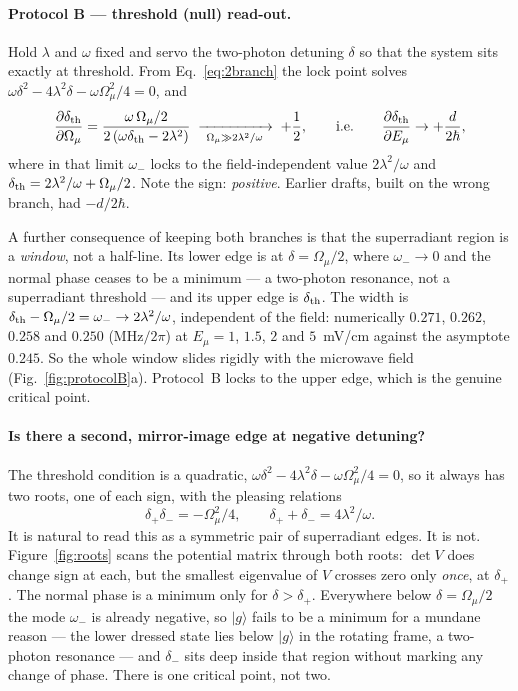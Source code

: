 \documentclass[11pt,a4paper]{article}
\newcommand{\Omu}{\Omega_{\mu}}
\newcommand{\ket}[1]{\lvert #1 \rangle}
\begin{document}
\paragraph{Protocol B --- threshold (null) read-out.}
Hold $\lambda$ and $\omega$ fixed and servo the two-photon detuning $\delta$ so that the
system sits exactly at threshold. From Eq.~\eqref{eq:2branch} the lock point solves
$\omega\delta^2-4\lambda^2\delta-\omega\Omu^2/4=0$, and
\begin{equation}
  \frac{\partial\delta_{\rm th}}{\partial\Omu}
   = \frac{\omega\,\Omu/2}{2\left(\omega\delta_{\rm th}-2\lambda^2\right)}
  \;\xrightarrow[\ \Omu\gg2\lambda^2/\omega\ ]{}\;+\frac12,
  \qquad\text{i.e.}\qquad
  \frac{\partial \delta_{\rm th}}{\partial E_\mu} \to +\frac{d}{2\hbar},
  \label{eq:slopeB}
\end{equation}
where in that limit $\omega_-$ locks to the field-independent value $2\lambda^2/\omega$ and
$\delta_{\rm th}=2\lambda^2/\omega+\Omu/2$. Note the sign: \emph{positive}. Earlier drafts,
built on the wrong branch, had $-d/2\hbar$.

A further consequence of keeping both branches is that the superradiant region is a
\emph{window}, not a half-line. Its lower edge is at $\delta=\Omu/2$, where $\omega_-\to0$ and
the normal phase ceases to be a minimum --- a two-photon resonance, not a superradiant
threshold --- and its upper edge is $\delta_{\rm th}$. The width is
$\delta_{\rm th}-\Omu/2=\omega_-\to2\lambda^2/\omega$, independent of the field: numerically
$0.271$, $0.262$, $0.258$ and $0.250$ (MHz$/2\pi$) at $E_\mu=1$, $1.5$, $2$ and $5$~mV/cm
against the asymptote $0.245$. So the whole window slides rigidly with the microwave field
(Fig.~\ref{fig:protocolB}a). Protocol~B locks to the upper edge, which is the genuine
critical point.

\paragraph{Is there a second, mirror-image edge at negative detuning?} The threshold condition
is a quadratic, $\omega\delta^2-4\lambda^2\delta-\omega\Omu^2/4=0$, so it always has two roots,
one of each sign, with the pleasing relations
\begin{equation}
  \delta_+\delta_- = -\Omu^2/4, \qquad \delta_+ + \delta_- = 4\lambda^2/\omega .
\end{equation}
It is natural to read this as a symmetric pair of superradiant edges. It is not.
Figure~\ref{fig:roots} scans the potential matrix through both roots: $\det V$ does change sign
at each, but the smallest eigenvalue of $V$ crosses zero only \emph{once}, at $\delta_+$. The
normal phase is a minimum only for $\delta>\delta_+$. Everywhere below $\delta=\Omu/2$ the mode
$\omega_-$ is already negative, so $\ket{g}$ fails to be a minimum for a mundane reason --- the
lower dressed state lies below $\ket{g}$ in the rotating frame, a two-photon resonance --- and
$\delta_-$ sits deep inside that region without marking any change of phase. There is one
critical point, not two.
\end{document}
